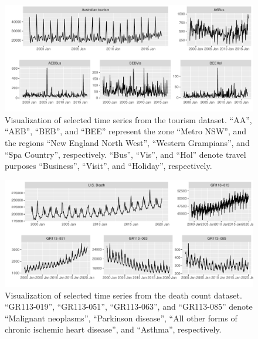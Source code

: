 \documentclass[a4paper,review,12pt,authoryear]{elsarticle}
\begin{document}
\begin{figure}[h!]
    \centering
    \includegraphics[width=\textwidth]{figures/tourism.pdf}
    \vspace{-0.35in}
    \caption{Visualization of selected time series from the tourism dataset. ``AA'', ``AEB'', ``BEB'', and ``BEE'' represent the zone ``Metro NSW'', and the regions ``New England North West'', ``Western Grampians'', and ``Spa Country'', respectively. ``Bus'', ``Vis'', and ``Hol'' denote travel purposes ``Business'', ``Visit'', and ``Holiday'', respectively.}
    \label{fig:tourism}
\end{figure}


\begin{figure}[h!]
    \centering
    \vspace{-0.2in}\includegraphics[width=\textwidth]{figures/mortality.pdf}
    \vspace{-0.35in}
    \caption{{Visualization of selected time series from the death count dataset.} ``GR113-019'', ``GR113-051'',  ``GR113-063'', and ``GR113-085'' denote ``Malignant neoplasms'', ``Parkinson disease'', ``All other forms of chronic ischemic heart disease'', and ``Asthma'', respectively.}
    \vspace{-0.2in}
    \label{fig:mortality}
\end{figure}



\end{document}
